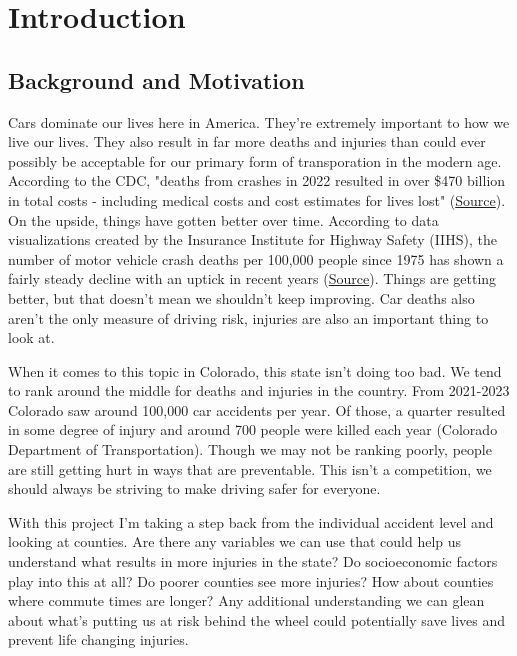 \section*{Introduction}

\subsection*{Background and Motivation}

Cars dominate our lives here in America. They're extremely important to how we live our lives. They also result in far more deaths and injuries than could ever possibly be acceptable for our primary form of transporation in the modern age. According to the CDC, "deaths from crashes in 2022 resulted in over \$470 billion in total costs - including medical costs and cost estimates for lives lost" (\href{https://www.cdc.gov/transportation-safety/about/index.html}{Source}). On the upside, things have gotten better over time. According to data visualizations created by the Insurance Institute for Highway Safety (IIHS), the number of motor vehicle crash deaths per 100,000 people since 1975 has shown a fairly steady decline with an uptick in recent years (\href{https://www.iihs.org/topics/fatality-statistics/detail/yearly-snapshot}{Source}). Things are getting better, but that doesn't mean we shouldn't keep improving. Car deaths also aren't the only measure of driving risk, injuries are also an important thing to look at. 

When it comes to this topic in Colorado, this state isn't doing too bad. We tend to rank around the middle for deaths and injuries in the country. From 2021-2023 Colorado saw around 100,000 car accidents per year. Of those, a quarter resulted in some degree of injury and around 700 people were killed each year (Colorado Department of Transportation). Though we may not be ranking poorly, people are still getting hurt in ways that are preventable. This isn't a competition, we should always be striving to make driving safer for everyone.

With this project I'm taking a step back from the individual accident level and looking at counties. Are there any variables we can use that could help us understand what results in more injuries in the state? Do socioeconomic factors play into this at all? Do poorer counties see more injuries? How about counties where commute times are longer? Any additional understanding we can glean about what's putting us at risk behind the wheel could potentially save lives and prevent life changing injuries.

